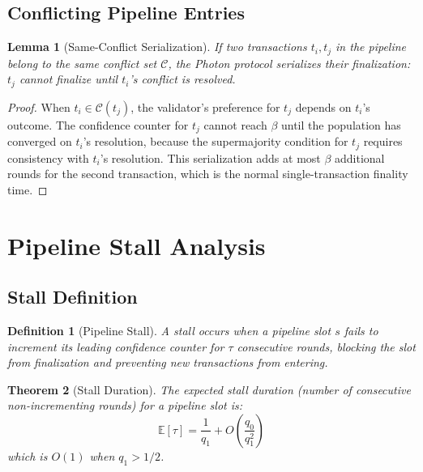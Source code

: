 \documentclass[11pt,a4paper]{article}
\newtheorem{theorem}{Theorem}[section]
\newtheorem{lemma}[theorem]{Lemma}
\newtheorem{definition}{Definition}[section]
\begin{document}
\subsection{Conflicting Pipeline Entries}

\begin{lemma}[Same-Conflict Serialization]
\label{lem:serialization}
If two transactions $t_i, t_j$ in the pipeline belong to the same conflict set
$\mathcal{C}$, the Photon protocol serializes their finalization: $t_j$ cannot finalize
until $t_i$'s conflict is resolved.
\end{lemma}

\begin{proof}
When $t_i \in \mathcal{C}(t_j)$, the validator's preference for $t_j$ depends on $t_i$'s
outcome. The confidence counter for $t_j$ cannot reach $\beta$ until the population
has converged on $t_i$'s resolution, because the supermajority condition for $t_j$
requires consistency with $t_i$'s resolution. This serialization adds at most $\beta$
additional rounds for the second transaction, which is the normal single-transaction
finality time.
\end{proof}

\section{Pipeline Stall Analysis}
\label{sec:stalls}

\subsection{Stall Definition}

\begin{definition}[Pipeline Stall]
A stall occurs when a pipeline slot $s$ fails to increment its leading confidence
counter for $\tau$ consecutive rounds, blocking the slot from finalization and preventing
new transactions from entering.
\end{definition}

\begin{theorem}[Stall Duration]
\label{thm:stall}
The expected stall duration (number of consecutive non-incrementing rounds) for a
pipeline slot is:
\[
\mathbb{E}[\tau] = \frac{1}{q_1} + O\left(\frac{q_0}{q_1^2}\right)
\]
which is $O(1)$ when $q_1 > 1/2$.
\end{theorem}
\end{document}
